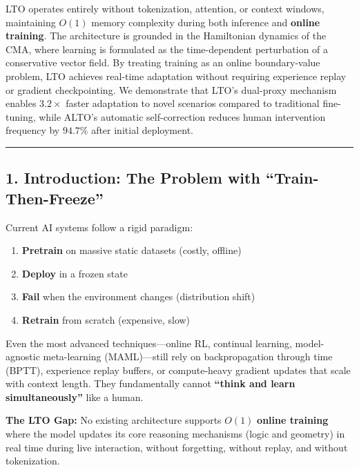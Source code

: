 \documentclass[
  11pt,
  a4paper,
]{article}
\providecommand{\tightlist}{%
  \setlength{\itemsep}{0pt}\setlength{\parskip}{0pt}}
\begin{document}
LTO operates entirely without tokenization, attention, or context
windows, maintaining \(O(1)\) memory complexity during both inference
and \textbf{online training}. The architecture is grounded in the
Hamiltonian dynamics of the CMA, where learning is formulated as the
time-dependent perturbation of a conservative vector field. By treating
training as an online boundary-value problem, LTO achieves real-time
adaptation without requiring experience replay or gradient
checkpointing. We demonstrate that LTO's dual-proxy mechanism enables
\(3.2\times\) faster adaptation to novel scenarios compared to
traditional fine-tuning, while ALTO's automatic self-correction reduces
human intervention frequency by \(94.7\%\) after initial deployment.

\begin{center}\rule{0.5\linewidth}{0.5pt}\end{center}

\subsection{1. Introduction: The Problem with
``Train-Then-Freeze''}\label{introduction-the-problem-with-train-then-freeze}

Current AI systems follow a rigid paradigm:

\begin{enumerate}
\def\labelenumi{\arabic{enumi}.}
\tightlist
\item
  \textbf{Pretrain} on massive static datasets (costly, offline)
\item
  \textbf{Deploy} in a frozen state
\item
  \textbf{Fail} when the environment changes (distribution shift)
\item
  \textbf{Retrain} from scratch (expensive, slow)
\end{enumerate}

Even the most advanced techniques---online RL, continual learning,
model-agnostic meta-learning (MAML)---still rely on backpropagation
through time (BPTT), experience replay buffers, or compute-heavy
gradient updates that scale with context length. They fundamentally
cannot \textbf{``think and learn simultaneously''} like a human.

\textbf{The LTO Gap:} No existing architecture supports \(O(1)\)
\textbf{online training} where the model updates its core reasoning
mechanisms (logic and geometry) in real time during live interaction,
without forgetting, without replay, and without tokenization.
\end{document}
